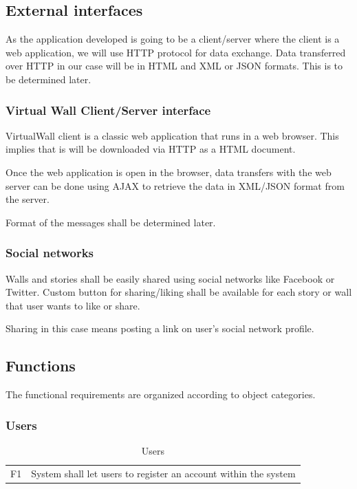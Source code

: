 \documentclass[11pt]{book}
\begin{document}
\subsection{External interfaces}
As the application developed is going to be a client/server where the client is a web application, we will use HTTP protocol for data exchange. Data transferred over HTTP in our case will be in HTML and XML or JSON formats. This is to be determined later.

\subsubsection{Virtual Wall Client/Server interface}
VirtualWall client is a classic web application that runs in a web browser. This implies that is will be downloaded via HTTP as a HTML document.

Once the web application is open in the browser, data transfers with the web server can be done using AJAX to retrieve the data in XML/JSON format from the server.

Format of the messages shall be determined later.

\subsubsection{Social networks}\label{sec:socialnetworks}
Walls and stories shall be easily shared using social networks like Facebook or Twitter. Custom button for sharing/liking shall be available for each story or wall that user wants to like or share.

Sharing in this case means posting a link on user's social network profile.

\subsection{Functions}
The functional requirements are organized according to object categories.

\subsubsection{Users}

\begin{table}[H]
\centering
\begin{tabular}{ l  p{11cm} }
F1 & System shall let users to register an account within the system\\
\end{tabular}
\label{tab:requirements_users}
\caption{Users}
\end{table}
\end{document}
